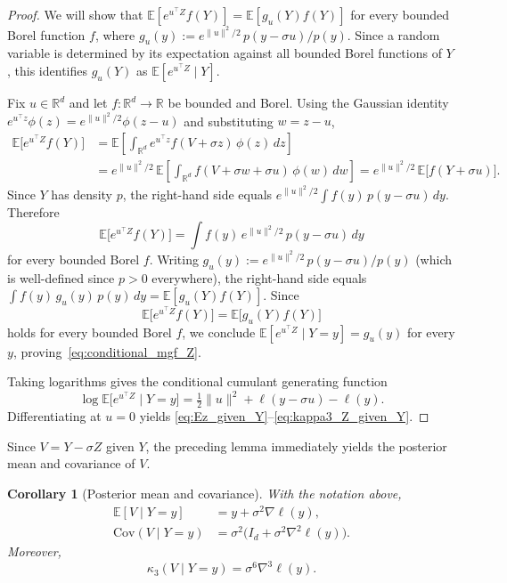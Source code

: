 \documentclass[11pt]{article}
\def\E{\mathbb{E}}
\def\R{\mathbb{R}}
\newcommand{\norm}[1]{\|#1\|}
\newcommand{\Cov}{\mathrm{Cov}}
\newtheorem{corollary}{Corollary}
\begin{document}
\begin{proof}
We will show that \(\E[e^{u^\top Z}f(Y)] = \E[g_u(Y)f(Y)]\) for every bounded Borel function \(f\), where \(g_u(y):=e^{\norm{u}^2/2}\,p(y-\sigma u)/p(y)\). Since a random variable is determined by its expectation against all bounded Borel functions of \(Y\), this identifies \(g_u(Y)\) as \(\E[e^{u^\top Z}\mid Y]\).

Fix \(u\in\R^d\) and let \(f:\R^d\to\R\) be bounded and Borel. Using the Gaussian identity \(e^{u^\top z}\phi(z)=e^{\norm{u}^2/2}\phi(z-u)\) and substituting \(w=z-u\),
\begin{align*}
\E\big[e^{u^\top Z}f(Y)\big]
&=
\E\!\left[\int_{\R^d} e^{u^\top z} f(V+\sigma z)\,\phi(z)\,dz\right] \\
&=
e^{\norm{u}^2/2}\,
\E\!\left[\int_{\R^d} f(V+\sigma w+\sigma u)\,\phi(w)\,dw\right]
=
e^{\norm{u}^2/2}\,\E\big[f(Y+\sigma u)\big].
\end{align*}
Since \(Y\) has density \(p\), the right-hand side equals \(e^{\norm{u}^2/2}\int f(y)\,p(y-\sigma u)\,dy\). Therefore
\[
\E\big[e^{u^\top Z}f(Y)\big]
=
\int f(y)\,e^{\norm{u}^2/2}\,p(y-\sigma u)\,dy
\]
for every bounded Borel \(f\). Writing \(g_u(y):=e^{\norm{u}^2/2}\,p(y-\sigma u)/p(y)\) (which is well-defined since \(p>0\) everywhere), the right-hand side equals \(\int f(y)\,g_u(y)\,p(y)\,dy = \E[g_u(Y)f(Y)]\). Since
\[
\E\big[e^{u^\top Z}f(Y)\big] = \E\big[g_u(Y)f(Y)\big]
\]
holds for every bounded Borel \(f\), we conclude \(\E[e^{u^\top Z}\mid Y=y]=g_u(y)\) for every \(y\), proving~\eqref{eq:conditional_mgf_Z}.

Taking logarithms gives the conditional cumulant generating function
\[
\log\E\big[e^{u^\top Z}\mid Y=y\big]
=
\tfrac12\norm{u}^2 + \ell(y-\sigma u)-\ell(y).
\]
Differentiating at \(u=0\) yields \eqref{eq:Ez_given_Y}--\eqref{eq:kappa3_Z_given_Y}.
\end{proof}

Since \(V = Y-\sigma Z\) given \(Y\), the preceding lemma immediately yields the posterior mean and covariance of \(V\).

\begin{corollary}[Posterior mean and covariance]
\label{cor:posterior_mean_cov}
With the notation above,
\begin{align*}
\E[V\mid Y=y]
&= y + \sigma^2\nabla\ell(y), \\
\Cov(V\mid Y=y)
&= \sigma^2\bigl(I_d+\sigma^2\nabla^2\ell(y)\bigr).
\end{align*}
Moreover,
\begin{equation}
\label{eq:kappa3_V_given_Y}
\kappa_3(V\mid Y=y)=\sigma^6\nabla^3\ell(y).
\end{equation}
\end{corollary}
\end{document}
